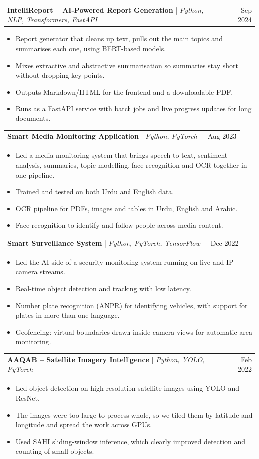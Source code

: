 \documentclass[letterpaper,11pt]{article}
\makeatletter
\newcommand{\resumeItem}[1]{
  \item\small{
    {#1 \vspace{-2pt}}
  }
}
\newcommand{\resumeProjectHeading}[2]{
    \item
    \begin{tabular*}{0.97\textwidth}{l@{\extracolsep{\fill}}r}
      \small#1~ & #2 \\
    \end{tabular*}\vspace{-7pt}
}
\newcommand{\resumeItemListStart}{\begin{itemize}}
\newcommand{\resumeItemListEnd}{\end{itemize}\vspace{-5pt}}
\makeatother
\begin{document}
      \resumeProjectHeading
          {\textbf{IntelliReport -- AI-Powered Report Generation} | \emph{Python, NLP, Transformers, FastAPI}}{Sep 2024}
          \resumeItemListStart
            \resumeItem{Report generator that cleans up text, pulls out the main topics and summarises each one, using BERT-based models.}
            \resumeItem{Mixes extractive and abstractive summarisation so summaries stay short without dropping key points.}
            \resumeItem{Outputs Markdown/HTML for the frontend and a downloadable PDF.}
            \resumeItem{Runs as a FastAPI service with batch jobs and live progress updates for long documents.}
          \resumeItemListEnd

      \resumeProjectHeading
          {\textbf{Smart Media Monitoring Application} | \emph{Python, PyTorch}}{Aug 2023}
          \resumeItemListStart
            \resumeItem{Led a media monitoring system that brings speech-to-text, sentiment analysis, summaries, topic modelling, face recognition and OCR together in one pipeline.}
            \resumeItem{Trained and tested on both Urdu and English data.}
            \resumeItem{OCR pipeline for PDFs, images and tables in Urdu, English and Arabic.}
            \resumeItem{Face recognition to identify and follow people across media content.}
          \resumeItemListEnd

      \resumeProjectHeading
          {\textbf{Smart Surveillance System} | \emph{Python, PyTorch, TensorFlow}}{Dec 2022}
          \resumeItemListStart
            \resumeItem{Led the AI side of a security monitoring system running on live and IP camera streams.}
            \resumeItem{Real-time object detection and tracking with low latency.}
            \resumeItem{Number plate recognition (ANPR) for identifying vehicles, with support for plates in more than one language.}
            \resumeItem{Geofencing: virtual boundaries drawn inside camera views for automatic area monitoring.}
          \resumeItemListEnd

      \resumeProjectHeading
          {\textbf{AAQAB -- Satellite Imagery Intelligence} | \emph{Python, YOLO, PyTorch}}{Feb 2022}
          \resumeItemListStart
            \resumeItem{Led object detection on high-resolution satellite images using YOLO and ResNet.}
            \resumeItem{The images were too large to process whole, so we tiled them by latitude and longitude and spread the work across GPUs.}
            \resumeItem{Used SAHI sliding-window inference, which clearly improved detection and counting of small objects.}
          \resumeItemListEnd
\end{document}
